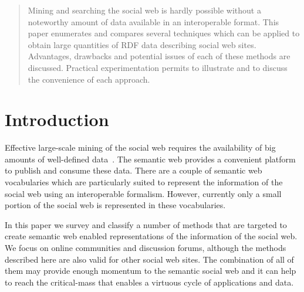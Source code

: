 \documentclass{../templates/www2008-submission}
\begin{document}


\maketitle

\begin{abstract}
Mining and searching the social web is hardly possible without
a noteworthy amount of data available in an interoperable
format. This paper enumerates and compares several techniques which can be
applied to obtain large quantities of RDF data describing
social web sites. Advantages, drawbacks and potential issues of
each of these methods are discussed. Practical experimentation
permits to illustrate and to discuss the convenience of each approach.
\end{abstract}



\section{Introduction}

Effective large-scale mining of the social web requires the
availability of big amounts of well-defined data~\cite{Mika2004}.
The semantic web provides a convenient platform to publish and
consume these data. There are a couple of semantic web vocabularies
which are particularly suited to represent the
information of the social web using an interoperable formalism.
However, currently only a small portion of the social web is
represented in these vocabularies.

In this paper we survey and classify a number of methods that
are targeted to create semantic web enabled representations of
the information of the social web. We focus on online communities
and discussion forums, although the methods described here are also valid
for other social web sites. The combination of all of them
may provide enough momentum to the semantic social
web and it can help to reach the critical-mass that
enables a virtuous cycle of applications and data.
\end{document}
